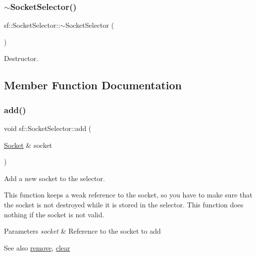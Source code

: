 \subsubsection{\texorpdfstring{$\sim$SocketSelector()}{~SocketSelector()}}
{\footnotesize\ttfamily sf\+::\+Socket\+Selector\+::$\sim$\+Socket\+Selector (\begin{DoxyParamCaption}{ }\end{DoxyParamCaption})}



Destructor. 

\begin{DoxyVerb}\end{DoxyVerb}
 

\subsection{Member Function Documentation}
\mbox{\label{classsf_1_1_socket_selector_ade952013232802ff7b9b33668f8d2096}} 
\subsubsection{\texorpdfstring{add()}{add()}}
{\footnotesize\ttfamily void sf\+::\+Socket\+Selector\+::add (\begin{DoxyParamCaption}\item[{\mbox{\hyperlink{classsf_1_1_socket}{Socket}} \&}]{socket }\end{DoxyParamCaption})}



Add a new socket to the selector. 

This function keeps a weak reference to the socket, so you have to make sure that the socket is not destroyed while it is stored in the selector. This function does nothing if the socket is not valid.


\begin{DoxyParams}{Parameters}
{\em socket} & Reference to the socket to add\\
\hline
\end{DoxyParams}
\begin{DoxySeeAlso}{See also}
\mbox{\hyperlink{classsf_1_1_socket_selector_a98b6ab693a65b82caa375639232357c1}{remove}}, \mbox{\hyperlink{classsf_1_1_socket_selector_a76e650acb0199d4be91e90a493fbc91a}{clear}} \begin{DoxyVerb}\end{DoxyVerb}
 
\end{DoxySeeAlso}
\mbox{\label{classsf_1_1_socket_selector_a76e650acb0199d4be91e90a493fbc91a}} 
